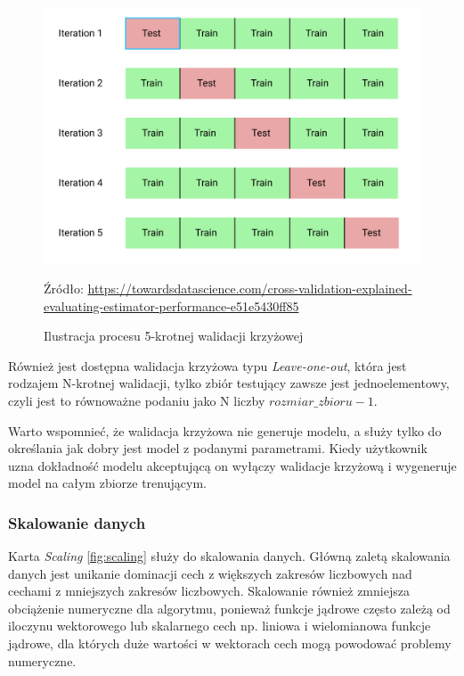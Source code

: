 \documentclass[paper=a4, fontsize=11pt]{scrartcl} %
\numberwithin{equation}{section} %
\numberwithin{figure}{section} %
\newcommand*{\captionsource}[2]{%
  \caption[{#1}]{%
      #1}
    Źródło: #2%
}
\begin{document}
    \begin{figure}[H]
        \begin{center}
            \includegraphics[scale=0.3]{./img/cv_ilustration.png}
            \captionsource{Ilustracja procesu 5-krotnej walidacji krzyżowej}
            {\url{https://towardsdatascience.com/cross-validation-explained-
            evaluating-estimator-performance-e51e5430ff85}}
            \label{fig:cv_ilustr}
        \end{center}
    \end{figure}

    \par Również jest dostępna walidacja krzyżowa typu \textit{Leave-one-out}, która jest
    rodzajem N-krotnej walidacji, tylko zbiór testujący zawsze jest jednoelementowy, czyli jest
    to równoważne podaniu jako N liczby $rozmiar\_zbioru - 1$.
    \par Warto wspomnieć, że walidacja krzyżowa nie generuje modelu, a służy tylko do
    określania jak dobry jest model z podanymi parametrami. Kiedy użytkownik uzna dokładność
    modelu akceptującą on wyłączy walidacje krzyżową i wygeneruje model na całym zbiorze
    trenującym.

\newpage
\subsubsection{Skalowanie danych}
    \par Karta \textit{Scaling} \ref{fig:scaling} służy do skalowania danych. Główną zaletą
    skalowania danych jest unikanie dominacji cech z większych zakresów liczbowych nad cechami
    z mniejszych zakresów liczbowych. Skalowanie również zmniejsza obciążenie numeryczne dla
    algorytmu, ponieważ funkcje jądrowe często zależą od iloczynu wektorowego lub skalarnego
    cech np.  liniowa i wielomianowa funkcje jądrowe, dla których duże wartości w wektorach
    cech mogą powodować problemy numeryczne.
\end{document}
